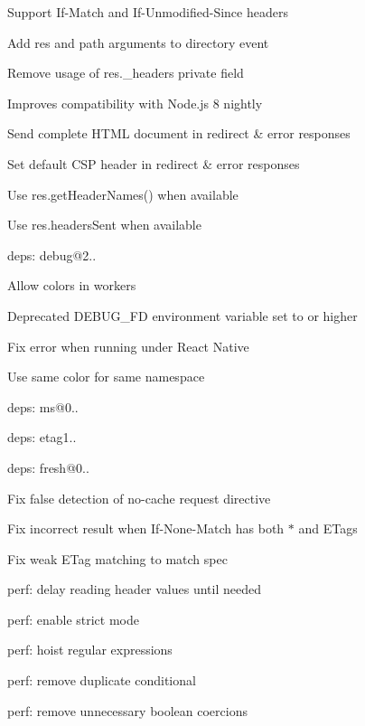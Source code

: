 \begin{DoxyItemize}
\item Support {\ttfamily If-\/\+Match} and {\ttfamily If-\/\+Unmodified-\/\+Since} headers
\item Add {\ttfamily res} and {\ttfamily path} arguments to {\ttfamily directory} event
\item Remove usage of {\ttfamily res.\+\_\+headers} private field
\begin{DoxyItemize}
\item Improves compatibility with Node.\+js 8 nightly
\end{DoxyItemize}
\item Send complete H\+T\+ML document in redirect \& error responses
\item Set default C\+SP header in redirect \& error responses
\item Use {\ttfamily res.\+get\+Header\+Names()} when available
\item Use {\ttfamily res.\+headers\+Sent} when available
\item deps\+: debug@2..
\begin{DoxyItemize}
\item Allow colors in workers
\item Deprecated {\ttfamily D\+E\+B\+U\+G\+\_\+\+FD} environment variable set to {} or higher
\item Fix error when running under React Native
\item Use same color for same namespace
\item deps\+: ms@0..
\end{DoxyItemize}
\item deps\+: etag1..
\item deps\+: fresh@0..
\begin{DoxyItemize}
\item Fix false detection of {\ttfamily no-\/cache} request directive
\item Fix incorrect result when {\ttfamily If-\/\+None-\/\+Match} has both {\ttfamily $\ast$} and E\+Tags
\item Fix weak {\ttfamily E\+Tag} matching to match spec
\item perf\+: delay reading header values until needed
\item perf\+: enable strict mode
\item perf\+: hoist regular expressions
\item perf\+: remove duplicate conditional
\item perf\+: remove unnecessary boolean coercions

\end{DoxyItemize}
\end{DoxyItemize}
